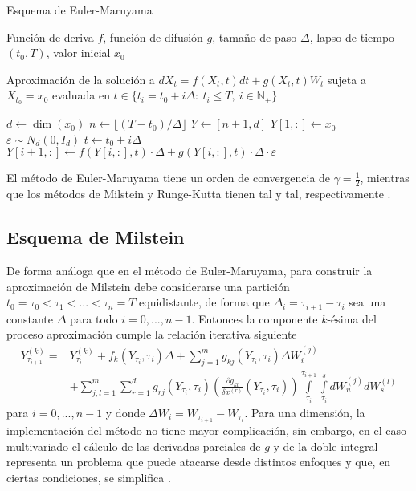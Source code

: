 \begin{algorithm}
\caption{Esquema de Euler-Maruyama}
\label{alg:EM}
\begin{algorithmic}[1]
\vspace{0.2cm}
\Require \parbox[t]{13cm}{
    Función de deriva $f$, función de difusión $g$, tamaño de paso 
    $\Delta$, lapso de tiempo $(t_0,T)$, valor inicial $x_0$
}
\vspace{0.2cm}
\Ensure 
\parbox[t]{13cm}{
    Aproximación de la solución a $dX_t=f(X_t,t)dt+g(X_t,t)W_t$ sujeta a 
    $X_{t_0}=x_0$ evaluada en 
    $t\in\{t_i=t_0 + i\Delta:\ t_i\leq T,\ i\in \mathbb N_+\}$
}
\vspace{0.2cm}
\State $d \leftarrow \dim(x_0)$
\State $n\leftarrow \lfloor(T-t_0)/\Delta\rfloor$
\State $Y \leftarrow [n+1,d]$
\State $Y[1,:]\leftarrow x_0$
    \State $\varepsilon \sim N_d(0, I_d)$
    \State $t\leftarrow t_0+i\Delta$
    \State $Y[i+1,:]\leftarrow f(Y[i,:],t)\cdot \Delta+g(Y[i,:],t)\cdot \Delta\cdot  \varepsilon$
\EndFor
\end{algorithmic}
\end{algorithm}

El método de Euler-Maruyama tiene un orden de convergencia de 
$\gamma = \frac{1}{2}$, mientras que los métodos de Milstein y 
Runge-Kutta tienen tal y tal, respectivamente 
\cite{fuchsInferenceDiffusionProcesses2013}.

\subsection{Esquema de Milstein}

De forma análoga que en el método de Euler-Maruyama, para construir la aproximación
de Milstein debe considerarse una partición $t_0=\tau_0<\tau_1<...<\tau_n=T$
equidistante, de forma que $\Delta_i=\tau_{i+1}-\tau_{i}$ 
sea una constante $\Delta$ para todo $i=0,...,n-1$. 
Entonces la componente $k$-ésima del proceso aproximación cumple la 
relación iterativa siguiente 
\begin{equation}\label{eq:Milstein}
    \begin{split}
        Y_{\tau_{i+1}}^{(k)}=&Y_{\tau_i}^{(k)}+f_k(Y_{\tau_{i}},\tau_i)\Delta
+ \sum_{j=1}^m g_{kj}(Y_{\tau_i},\tau_i)\Delta W_i^{(j)}\\
&+\sum_{j,l=1}^m\sum_{r=1}^dg_{rj}(Y_{\tau_i},\tau_i)
\left(\frac{\partial g_{kl}}{\delta x^{(r)}}(Y_{\tau_i},\tau_i) 
\right)\int\limits^{\tau_{i+1}}_{\tau_i} \int\limits^s_{\tau_i}dW_u^{(j)}dW_s^{(l)}
    \end{split}
\end{equation}
para $i=0,...,n-1$ y donde $\Delta W_{i}=W_{\tau_{i+1}}-W_{\tau_i}$. Para una 
dimensión, la implementación del método no tiene mayor complicación, 
sin embargo, en el caso multivariado el cálculo de las derivadas parciales 
de $g$ y de la doble integral representa un problema que puede atacarse 
desde distintos enfoques y que, en ciertas condiciones, se simplifica 
\cite{kloedenNumericalSolutionStochastic1992}. 


